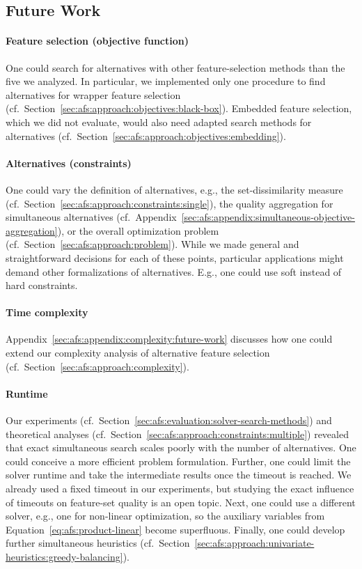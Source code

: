 \documentclass{article}
\theoremstyle{definition}
\begin{document}
\subsection{Future Work}
\label{sec:afs:conclusion:future-work}

\paragraph{Feature selection (objective function)}

One could search for alternatives with other feature-selection methods than the five we analyzed.
In particular, we implemented only one procedure to find alternatives for wrapper feature selection (cf.~Section~\ref{sec:afs:approach:objectives:black-box}).
Embedded feature selection, which we did not evaluate, would also need adapted search methods for alternatives (cf.~Section~\ref{sec:afs:approach:objectives:embedding}).

\paragraph{Alternatives (constraints)}

One could vary the definition of alternatives, e.g., the set-dissimilarity measure (cf.~Section~\ref{sec:afs:approach:constraints:single}), the quality aggregation for simultaneous alternatives (cf.~Appendix~\ref{sec:afs:appendix:simultaneous-objective-aggregation}), or the overall optimization problem (cf.~Section~\ref{sec:afs:approach:problem}).
While we made general and straightforward decisions for each of these points, particular applications might demand other formalizations of alternatives.
E.g., one could use soft instead of hard constraints.

\paragraph{Time complexity} Appendix~\ref{sec:afs:appendix:complexity:future-work} discusses how one could extend our complexity analysis of alternative feature selection (cf.~Section~\ref{sec:afs:approach:complexity}).

\paragraph{Runtime}

Our experiments (cf.~Section~\ref{sec:afs:evaluation:solver-search-methods}) and theoretical analyses (cf.~Section~\ref{sec:afs:approach:constraints:multiple}) revealed that exact simultaneous search scales poorly with the number of alternatives.
One could conceive a more efficient problem formulation.
Further, one could limit the solver runtime and take the intermediate results once the timeout is reached.
We already used a fixed timeout in our experiments, but studying the exact influence of timeouts on feature-set quality is an open topic.
Next, one could use a different solver, e.g., one for non-linear optimization, so the auxiliary variables from Equation~\ref{eq:afs:product-linear} become superfluous.
Finally, one could develop further simultaneous heuristics (cf.~Section~\ref{sec:afs:approach:univariate-heuristics:greedy-balancing}).
\end{document}
